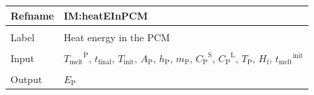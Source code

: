 \documentclass[12pt]{article}
\begin{document}
\vspace{\baselineskip}
\noindent
\begin{minipage}{\textwidth}
\begin{tabular}{>{\raggedright}p{}>{\raggedright\arraybackslash}p{}}
\toprule \textbf{Refname} & \textbf{IM:heatEInPCM}
\label{IM:heatEInPCM}
\\ \midrule \\
Label & Heat energy in the PCM
        
\\ \midrule \\
Input & ${{T_{\text{melt}}}^{\text{P}}}$, ${t_{\text{final}}}$, ${T_{\text{init}}}$, ${A_{\text{P}}}$, ${h_{\text{P}}}$, ${m_{\text{P}}}$, ${{C_{\text{P}}}^{\text{S}}}$, ${{C_{\text{P}}}^{\text{L}}}$, ${T_{\text{P}}}$, ${H_{\text{f}}}$, ${{t_{\text{melt}}}^{\text{init}}}$
        
\\ \midrule \\
Output & ${E_{\text{P}}}$
         

\end{tabular}
\end{minipage}
\end{document}
